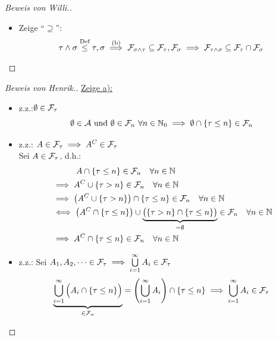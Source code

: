 \documentclass[12pt,a4paper]{article}
\begin{document}
\begin{proof}[Beweis von Willi.]
\begin{itemize}
\item Zeige ``$\supseteq$'':
\begin{align*}
\tau\wedge\sigma\stackrel{\text{Def}}{\leq}\tau,\sigma\stackrel{\text{(b)}}{\implies}\mathcal{F}_{\sigma\wedge\tau}\subseteq\mathcal{F}_\tau,\mathcal{F}_\sigma\implies\mathcal{F}_{\tau\wedge\sigma}\subseteq\mathcal{F}_\tau\cap\mathcal{F}_\sigma
\end{align*}
\end{itemize}
\end{proof}

\begin{proof}[Beweis von Henrik.]\enter
\underline{Zeige a):}\\
\begin{itemize} 
	\item z.z.:$\emptyset \in \mathcal{F}_\tau$\\
	\begin{equation*}
		\emptyset \in \mathcal{A} \text{ und } \emptyset \in \mathcal{F}_n\  \forall n \in \mathbb{N}_0 \implies \emptyset \cap \{\tau \leq n\} \in \mathcal{F}_n
	\end{equation*}
	\item z.z.: $A \in \mathcal{F}_\tau \implies A^C \in \mathcal{F}_\tau$\\
	Sei $A \in \mathcal{F}_\tau$, d.h.:
	\begin{align*}
		&{}\qquad \quad  A \cap \{\tau \leq n\} \in \mathcal{F}_n \quad \forall n \in \mathbb{N}\\
		&\implies	A^C \cup \{\tau > n\} \in \mathcal{F}_n \quad \forall n \in \mathbb{N}\\
		&\implies 	\left(	A^C \cup \{\tau > n\}\right) \cap \{\tau \leq n\} \in \mathcal{F}_n \quad \forall n \in \mathbb{N}\\
		& \iff \left(	A^C \cap \{\tau \leq n\}\right) \cup \underbrace{\big ( \{\tau > n\}\cap\{\tau \leq n\} \big )}_{= \emptyset} \in \mathcal{F}_n \quad \forall n \in \mathbb{N}\\
		&\implies A^C \cap \{\tau \leq n\} \in \mathcal{F}_n \quad \forall n \in \mathbb{N}
	\end{align*}
	
	\item z.z.: Sei $A_1, A_2,\dots \in \mathcal{F}_\tau \implies \bigcup\limits_{i=1}^{\infty} A_i  \in \mathcal{F}_\tau$\\
	\begin{equation*}
		\underbrace{\bigcup\limits_{i=1}^{\infty} \Big (A_i \cap \{\tau \leq n\} \Big )}_{\in \mathcal{F}_n} = \left( \bigcup\limits_{i=1}^{\infty} A_i \right)\cap \{\tau \leq n\} \implies  \bigcup\limits_{i=1}^{\infty} A_i \in \mathcal{F}_\tau
	\end{equation*}
	
\end{itemize}


\end{proof}
\end{document}
